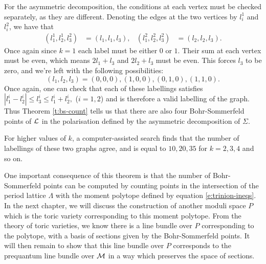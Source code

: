 	For the asymmetric decomposition, the conditions at each vertex must be checked separately, as they are different. Denoting the edges at the two vertices by $l^1_i$ and $l^2_i$, we have that
	\begin{align}
		(l^1_1,l^1_2,l^2_3) &= (l_1, l_1, l_3), & (l^2_1,l^2_2,l^2_3) &= (l_2, l_2, l_3).
	\end{align} 
	Once again since $k=1$ each label must be either $0$ or $1$. Their sum at each vertex must be even, which means $2l_1 + l_3$ and $2l_2 + l_3$ must be even. This forces $l_3$ to be zero, and we're left with the following possibilities:
	\begin{equation}
		(l_1,l_2,l_3) = (0,0,0), (1,0,0), (0,1,0), (1,1,0).
	\end{equation}
	Once again, one can check that each of these labellings satisfies $|l^i_1-l^i_2| \leq l^i_3 \leq l^i_1+l^i_2,$ ($i=1,2$) and is therefore a valid labelling of the graph. Thus Theorem \ref{t:bs-count} tells us that there are also four Bohr-Sommerfeld points of $\mathcal{L}$ in the polarisation defined by the asymmetric decomposition of $\Sigma$.
	
	For higher values of $k$, a computer-assisted search finds that the number of labellings of these two graphs agree, and is equal to $10, 20, 35$ for $k=2, 3, 4$ and so on.  

	One important consequence of this theorem is that the number of Bohr-Sommerfeld points can be computed by counting points in the intersection of the period lattice $\Lambda$ with the moment polytope defined by equation \ref{e:trinion-ineqs}. In the next chapter, we will discuss the construction of another moduli space $P$ which is the toric variety corresponding to this moment polytope. From the theory of toric varieties, we know there is a line bundle over $P$ corresponding to the polytope, with a basis of sections given by the Bohr-Sommerfeld points. It will then remain to show that this line bundle over $P$ corresponds to the prequantum line bundle over $\mathcal{M}$ in a way which preserves the space of sections.
	
	